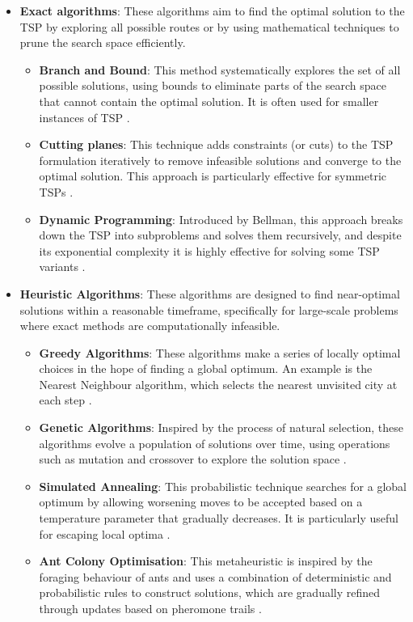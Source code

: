 \documentclass[conference]{IEEEtran}
\begin{document}
\begin{itemize}
    \item \textbf{Exact algorithms}: These algorithms aim to find the optimal solution to the TSP by exploring all possible routes or by using mathematical techniques to prune the search space efficiently.
          \begin{itemize}
              \item \textbf{Branch and Bound}: This method systematically explores the set of all possible solutions, using bounds to eliminate parts of the search space that cannot contain the optimal solution. It is often used for smaller instances of TSP \cite{branch_and_bound}.
              \item \textbf{Cutting planes}: This technique adds constraints (or cuts) to the TSP formulation iteratively to remove infeasible solutions and converge to the optimal solution. This approach is particularly effective for symmetric TSPs \cite{cutting_planes}.
              \item \textbf{Dynamic Programming}: Introduced by Bellman, this approach breaks down the TSP into subproblems and solves them recursively, and despite its exponential complexity it is highly effective for solving some TSP variants \cite{dynamic_programming_tsp}.
          \end{itemize}
    \item \textbf{Heuristic Algorithms}: These algorithms are designed to find near-optimal solutions within a reasonable timeframe, specifically for large-scale problems where exact methods are computationally infeasible.
          \begin{itemize}
              \item \textbf{Greedy Algorithms}: These algorithms make a series of locally optimal choices in the hope of finding a global optimum. An example is the Nearest Neighbour algorithm, which selects the nearest unvisited city at each step \cite{greedy}.
              \item \textbf{Genetic Algorithms}: Inspired by the process of natural selection, these algorithms evolve a population of solutions over time, using operations such as mutation and crossover to explore the solution space \cite{genetic_algorithm}.
              \item \textbf{Simulated Annealing}: This probabilistic technique searches for a global optimum by allowing worsening moves to be accepted based on a temperature parameter that gradually decreases. It is particularly useful for escaping local optima \cite{simulated_annealing}.
              \item \textbf{Ant Colony Optimisation}: This metaheuristic is inspired by the foraging behaviour of ants and uses a combination of deterministic and probabilistic rules to construct solutions, which are gradually refined through updates based on pheromone trails \cite{ant_colony}.
          \end{itemize}
\end{itemize}
\end{document}
